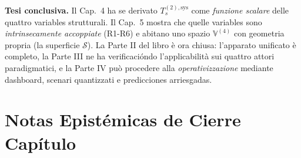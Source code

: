 \Hypoth{} \textbf{Tesi conclusiva.} Il Cap.~4 ha se derivato
\(T_s^{(2),\text{sys}}\) come \emph{funzione scalare} delle quattro
variables strutturali. Il Cap.~5 mostra che quelle variables sono
\emph{intrinsecamente accoppiate} (R1-R6) e abitano uno spazio
\(\mathbb{V}^{(4)}\) con geometria propria (la superficie
\(\mathcal{S}\)). La Parte II del libro è ora chiusa: l'apparato
unificato è completo, la Parte III ne ha verificacióndo l'applicabilità sui
quattro attori paradigmatici, e la Parte IV può procedere alla
\emph{operativizzazione} mediante dashboard, scenari quantizzati e
predicciones arriesgadas.



\section{Notas Epistémicas de Cierre
Capítulo}\label{note-epistemiche-di-chiusura-capítulo}

